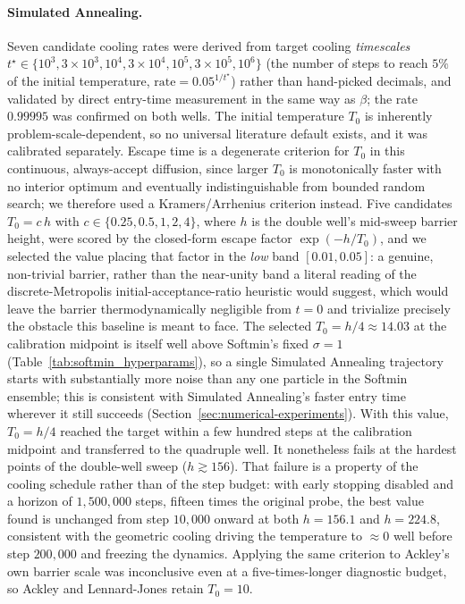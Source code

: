 \documentclass{opt2026} %
\begin{document}
\paragraph{Simulated Annealing.} Seven candidate cooling rates were derived from target cooling \emph{timescales} $t^\star\in\{10^3,3{\times}10^3,10^4,3{\times}10^4,10^5,3{\times}10^5,10^6\}$ (the number of steps to reach $5\%$ of the initial temperature, $\text{rate}=0.05^{1/t^\star}$) rather than hand-picked decimals, and validated by direct entry-time measurement in the same way as $\beta$; the rate $0.99995$ was confirmed on both wells. The initial temperature $T_0$ is inherently problem-scale-dependent, so no universal literature default exists, and it was calibrated separately. Escape time is a degenerate criterion for $T_0$ in this continuous, always-accept diffusion, since larger $T_0$ is monotonically faster with no interior optimum and eventually indistinguishable from bounded random search; we therefore used a Kramers/Arrhenius criterion instead. Five candidates $T_0=c\,h$ with $c\in\{0.25,0.5,1,2,4\}$, where $h$ is the double well's mid-sweep barrier height, were scored by the closed-form escape factor $\exp(-h/T_0)$, and we selected the value placing that factor in the \emph{low} band $[0.01,0.05]$: a genuine, non-trivial barrier, rather than the near-unity band a literal reading of the discrete-Metropolis initial-acceptance-ratio heuristic \citep{kirkpatrick1983optimization} would suggest, which would leave the barrier thermodynamically negligible from $t=0$ and trivialize precisely the obstacle this baseline is meant to face. The selected $T_0=h/4\approx14.03$ at the calibration midpoint is itself well above Softmin's fixed $\sigma=1$ (Table~\ref{tab:softmin_hyperparams}), so a single Simulated Annealing trajectory starts with substantially more noise than any one particle in the Softmin ensemble; this is consistent with Simulated Annealing's faster entry time wherever it still succeeds (Section~\ref{sec:numerical-experiments}). With this value, $T_0=h/4$ reached the target within a few hundred steps at the calibration midpoint and transferred to the quadruple well. It nonetheless fails at the hardest points of the double-well sweep ($h\gtrsim156$). That failure is a property of the cooling schedule rather than of the step budget: with early stopping disabled and a horizon of $1{,}500{,}000$ steps, fifteen times the original probe, the best value found is unchanged from step $10{,}000$ onward at both $h=156.1$ and $h=224.8$, consistent with the geometric cooling driving the temperature to $\approx0$ well before step $200{,}000$ and freezing the dynamics. Applying the same criterion to Ackley's own barrier scale was inconclusive even at a five-times-longer diagnostic budget, so Ackley and Lennard-Jones retain $T_0=10$.
\end{document}
